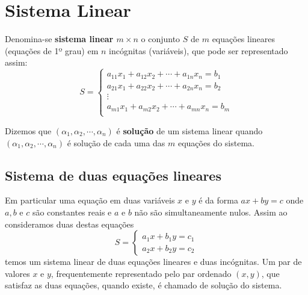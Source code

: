 
\chapter{Sistema Linear}

Denomina-se \textbf{sistema linear $m \times n$} o conjunto $S$ de $m$ equações lineares (equações de 1º grau) em $n$ incógnitas (variáveis), que pode ser representado assim:
\[S= \begin{cases}
      a_{11}x_1 + a_{12}x_2 + \cdots + a_{1n}x_n = b_1 \\
      a_{21}x_1 + a_{22}x_2 + \cdots + a_{2n}x_n = b_2 \\
      \vdots \\
      a_{m1}x_1 + a_{m2}x_2 + \cdots + a_{mn}x_n = b_m \\
     \end{cases} \]

Dizemos que $(\alpha_1, \alpha_2, \cdots, \alpha_n)$ é \textbf{solução} de um sistema linear quando $(\alpha_1, \alpha_2, \cdots, \alpha_n)$ é solução de cada uma das $m$ equações do sistema.

\section{Sistema de duas equações lineares}

\vskip0.3cm
 \colorbox{azul}{
 \begin{minipage}{0.9\linewidth}

  Em particular uma equação em duas variáveis $x$ e $y$ é da forma $ax + by= c$ onde $a, b$ e $c$ são constantes reais e $a$ e $b$ não são simultaneamente nulos. Assim ao consideramos duas destas equações
  \[S= \begin{cases}
      a_1x + b_1y= c_1 \\
      a_2x + b_2y= c_2
     \end{cases}\]
 temos um sistema linear de duas equações lineares e duas incógnitas. Um par de valores $x$ e $y$, frequentemente representado pelo par ordenado $(x, y)$, que satisfaz as duas equações, quando existe, é chamado de solução do sistema.

 \end{minipage}}
 \vskip0.3cm

